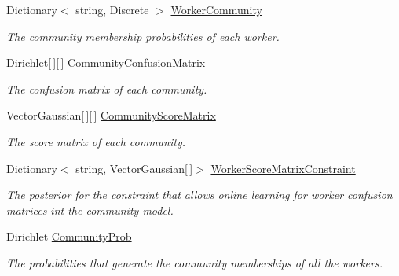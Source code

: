 \begin{DoxyCompactItemize}
Dictionary$<$ string, Discrete $>$ \hyperlink{class_crowdsourcing_models_1_1_results_a898393862d585cafb14aa6a2d617641e}{Worker\+Community}
\begin{DoxyCompactList}\small\item\em The community membership probabilities of each worker. \end{DoxyCompactList}\item 
Dirichlet\mbox{[}$\,$\mbox{]}\mbox{[}$\,$\mbox{]} \hyperlink{class_crowdsourcing_models_1_1_results_ad0d0152603265575be53ab612f892b6e}{Community\+Confusion\+Matrix}
\begin{DoxyCompactList}\small\item\em The confusion matrix of each community. \end{DoxyCompactList}\item 
Vector\+Gaussian\mbox{[}$\,$\mbox{]}\mbox{[}$\,$\mbox{]} \hyperlink{class_crowdsourcing_models_1_1_results_ac7537fa71a408a747852b7970805dc91}{Community\+Score\+Matrix}
\begin{DoxyCompactList}\small\item\em The score matrix of each community. \end{DoxyCompactList}\item 
Dictionary$<$ string, Vector\+Gaussian\mbox{[}$\,$\mbox{]}$>$ \hyperlink{class_crowdsourcing_models_1_1_results_acf297b7ce2319208a4875c77ca6aa535}{Worker\+Score\+Matrix\+Constraint}
\begin{DoxyCompactList}\small\item\em The posterior for the constraint that allows online learning for worker confusion matrices int the community model. \end{DoxyCompactList}\item 
Dirichlet \hyperlink{class_crowdsourcing_models_1_1_results_af44b21781d8413575f1196752ec04851}{Community\+Prob}
\begin{DoxyCompactList}\small\item\em The probabilities that generate the community memberships of all the workers. \end{DoxyCompactList}\item 

\end{DoxyCompactItemize}
